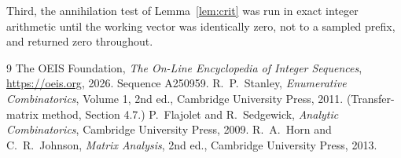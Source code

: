 \documentclass[11pt,a4paper]{article}
\theoremstyle{plain}
\theoremstyle{definition}
\begin{document}
Third, the annihilation test of Lemma~\ref{lem:crit} was run in exact integer arithmetic
until the working vector was identically zero, not to a sampled prefix, and returned zero
throughout.

\begin{thebibliography}{9}
 The OEIS Foundation, \emph{The On-Line Encyclopedia of Integer
Sequences}, \url{https://oeis.org}, 2026. Sequence A250959.
 R.~P.~Stanley, \emph{Enumerative Combinatorics}, Volume 1, 2nd ed.,
Cambridge University Press, 2011. (Transfer-matrix method, Section 4.7.)
 P.~Flajolet and R.~Sedgewick, \emph{Analytic Combinatorics}, Cambridge
University Press, 2009.
 R.~A.~Horn and C.~R.~Johnson, \emph{Matrix Analysis}, 2nd ed., Cambridge
University Press, 2013.
\end{thebibliography}
\end{document}
